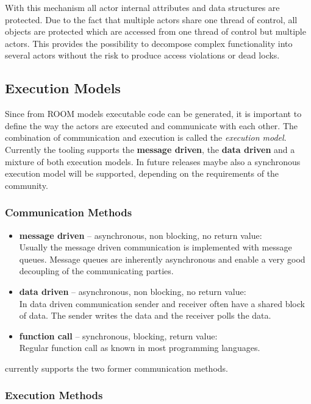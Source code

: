 With this mechanism all actor internal attributes and data structures are protected. Due to the fact that 
multiple actors share one thread of control, all objects are protected which are accessed from one thread 
of control but multiple actors. This provides the possibility to decompose complex functionality into 
several actors without the risk to produce access violations or dead locks.

\subsection{Execution Models}

Since from ROOM models executable code can be generated, it is important to define the way the actors are 
executed and communicate with each other. The combination of communication and execution is called the 
\emph{execution model}.
Currently the \eTrice{} tooling supports the \textbf{message driven}, the \textbf{data 
driven} and a mixture of both execution models. In future releases maybe also a synchronous
execution model will be supported, depending on the 
requirements of the community.

\subsubsection*{Communication Methods}

\begin{itemize}
\item \textbf{message driven} -- asynchronous, non blocking, no return value:\\
Usually the message driven 
communication is implemented with message queues. Message queues are inherently asynchronous and enable a 
very good decoupling of the communicating parties.
\item \textbf{data driven} -- asynchronous, non blocking, no return value:\\
In data driven communication 
sender and receiver often have a shared block of data. The sender writes the data and the receiver polls 
the data.
\item \textbf{function call} -- synchronous, blocking, return value:\\
Regular function call as known in most 
programming languages.
\end{itemize}

\eTrice{} currently supports the two former communication methods.

\subsubsection*{Execution Methods}

